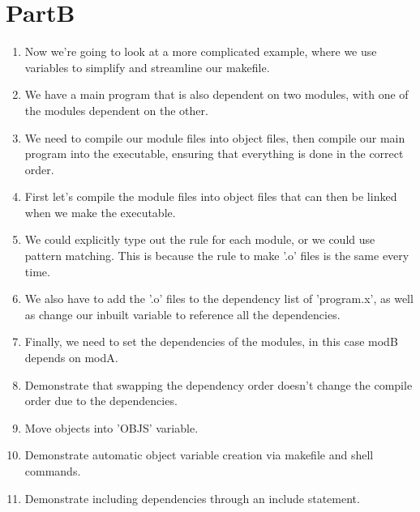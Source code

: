 \documentclass{article}
\begin{document}
\section{PartB}
\begin{enumerate}
\item Now we're going to look at a more complicated example, where we use variables to simplify and streamline our makefile.
\item We have a main program that is also dependent on two modules, with one of the modules dependent on the other.
\item We need to compile our module files into object files, then compile our main program into the executable, ensuring that everything is done in the correct order.
\item First let's compile the module files into object files that can then be linked when we make the executable.
\item We could explicitly type out the rule for each module, or we could use pattern matching. This is because the rule to make '.o' files is the same every time.
\item We also have to add the '.o' files to the dependency list of 'program.x', as well as change our inbuilt variable to reference all the dependencies.
\item Finally, we need to set the dependencies of the modules, in this case modB depends on modA.
\item Demonstrate that swapping the dependency order doesn't change the compile order due to the dependencies.
\item Move objects into 'OBJS' variable.
\item Demonstrate automatic object variable creation via makefile and shell commands.
\item Demonstrate including dependencies through an include statement. 
\end{enumerate}
\end{document}
